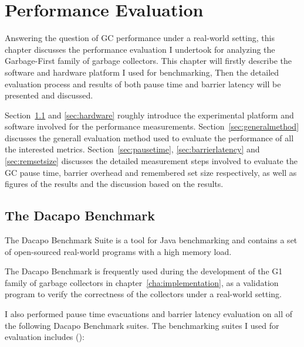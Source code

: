 \chapter{Performance Evaluation}
\label{cha:evaluation}

Answering the question of GC performance under a real-world setting,
this chapter discusses the performance evaluation I undertook for analyzing
the Garbage-First family of garbage collectors. This chapter will firstly describe the software and hardware platform I used for benchmarking,
Then the detailed evaluation process and results of both pause time and
barrier latency will be presented and discussed.

Section~\ref{sec:dacapo} and \ref{sec:hardware} roughly introduce the experimental
platform and software involved for the performance measurements.
Section~\ref{sec:generalmethod} discusses the generall evaluation method used to
evaluate the performance of all the interested metrics.
Section~\ref{sec:pausetime}, \ref{sec:barrierlatency} and \ref{sec:remsetsize} discusses the detailed
measurement steps involved to evaluate the GC pause time, barrier overhead and remembered set size
respectively, as well
as figures of the results and the discussion based on the results.

\section{The Dacapo Benchmark} %
\label{sec:dacapo}

The Dacapo Benchmark Suite is a tool for Java benchmarking and contains a set of
open-sourced real-world programs with a high memory load.

The Dacapo Benchmark is frequently used during the development of the G1 family
of garbage collectors in chapter~\ref{cha:implementation}, as a validation program
to verify the correctness of the collectors under a real-world setting.

I also performed pause time evacuations and barrier latency evaluation
on all of the following Dacapo Benchmark suites.
The benchmarking suites I used for evaluation includes (\cite{Blackburn:2006:DBJ:1167515.1167488}):

